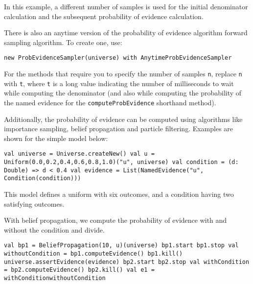 In this example, a different number of samples is used for the initial denominator calculation and the subsequent probability of evidence calculation.

There is also an anytime version of the probability of evidence algorithm forward sampling algorithm. To create one, use:

\begin{flushleft}
\texttt{new ProbEvidenceSampler(universe) with AnytimeProbEvidenceSampler}
\end{flushleft}

For the methods that require you to specify the number of samples \texttt{n}, replace \texttt{n} with \texttt{t}, where \texttt{t} is a long value indicating the number of milliseconds to wait while computing the denominator (and also while computing the probability of the named evidence for the \texttt{computeProbEvidence} shorthand method).

Additionally, the probability of evidence can be computed using algorithms like importance sampling, belief propagation and particle filtering. Examples are shown for the simple model below: 

\begin{flushleft}
    \texttt{val universe = Universe.createNew()
    \newline val u = Uniform(0.0,0.2,0.4,0.6,0.8,1.0)("u", universe)
    \newline val condition = (d: Double) => d < 0.4
    \newline val evidence = List(NamedEvidence("u", Condition(condition)))
}
\end{flushleft}

This model defines a uniform with six outcomes, and a condition having two satisfying outcomes.

With belief propagation, we compute the probability of evidence with and without the condition and divide.

\begin{flushleft}
\texttt{val bp1 = BeliefPropagation(10, u)(universe)
    \newline bp1.start
    \newline bp1.stop
    \newline val withoutCondition = bp1.computeEvidence()
    \newline bp1.kill()
    \newline 
    \newline universe.assertEvidence(evidence)
    \newline bp2.start
    \newline bp2.stop
    \newline val withCondition = bp2.computeEvidence()
    \newline bp2.kill()
    \newline val e1 = withConditionwithoutCondition
}
\end{flushleft}

